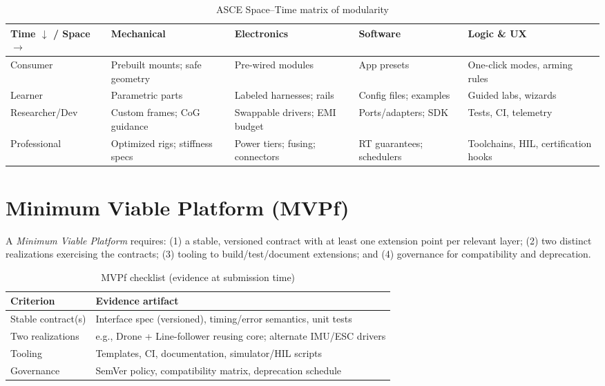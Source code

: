 \begin{table}[H]
\centering
\caption{ASCE Space--Time matrix of modularity}
\renewcommand{\arraystretch}{1.2}
\begin{tabularx}{\textwidth}{lXXXX}
\toprule
\textbf{Time $\downarrow$ / Space $\rightarrow$} & \textbf{Mechanical} & \textbf{Electronics} & \textbf{Software} & \textbf{Logic \& UX} \\
\midrule
Consumer & Prebuilt mounts; safe geometry & Pre-wired modules & App presets & One-click modes, arming rules \\
Learner & Parametric parts & Labeled harnesses; rails & Config files; examples & Guided labs, wizards \\
Researcher/Dev & Custom frames; CoG guidance & Swappable drivers; EMI budget & Ports/adapters; SDK & Tests, CI, telemetry \\
Professional & Optimized rigs; stiffness specs & Power tiers; fusing; connectors & RT guarantees; schedulers & Toolchains, HIL, certification hooks \\
\bottomrule
\end{tabularx}
\end{table}

\section{Minimum Viable Platform (MVPf)}\label{sec:mvpf}
A \emph{Minimum Viable Platform} requires: (1) a stable, versioned contract with at least one extension point per relevant layer; (2) two distinct realizations exercising the contracts; (3) tooling to build/test/document extensions; and (4) governance for compatibility and deprecation.

\begin{table}[h]
\centering
\caption{MVPf checklist (evidence at submission time)}
\renewcommand{\arraystretch}{1.2}
\begin{tabularx}{\textwidth}{lX}
\toprule
\textbf{Criterion} & \textbf{Evidence artifact} \\
\midrule
Stable contract(s) & Interface spec (versioned), timing/error semantics, unit tests \\
Two realizations & e.g., Drone + Line-follower reusing core; alternate IMU/ESC drivers \\
Tooling & Templates, CI, documentation, simulator/HIL scripts \\
Governance & SemVer policy, compatibility matrix, deprecation schedule \\
\bottomrule
\end{tabularx}
\end{table}

